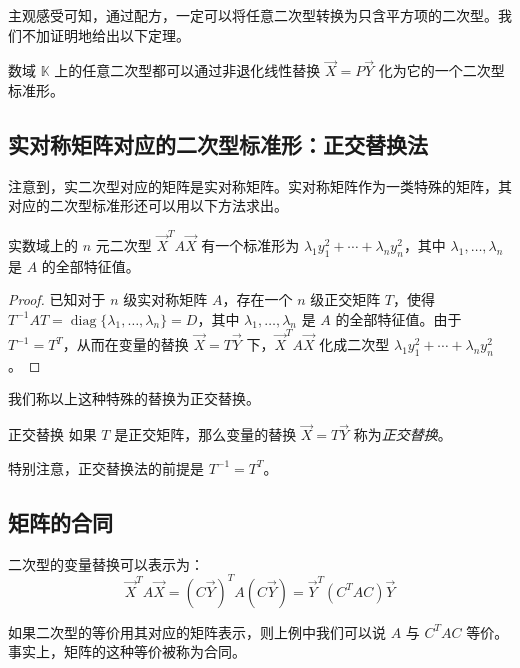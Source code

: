 主观感受可知，通过配方，一定可以将任意二次型转换为只含平方项的二次型。我们不加证明地给出以下定理。


\begin{theorem}
	数域 $\mathbb K$ 上的任意二次型都可以通过非退化线性替换 $\vec X = P \vec Y$ 化为它的一个二次型标准形。
\end{theorem}

\subsection{实对称矩阵对应的二次型标准形：正交替换法}

注意到，实二次型对应的矩阵是实对称矩阵。实对称矩阵作为一类特殊的矩阵，其对应的二次型标准形还可以用以下方法求出。

\begin{theorem}
	实数域上的 $n$ 元二次型 $\vec X^T A \vec X$ 有一个标准形为 $\lambda_1 y_1^2 + \cdots + \lambda_n y_n^2$，其中 $\lambda_1, \ldots, \lambda_n$ 是 $A$ 的全部特征值。
\end{theorem}

\begin{proof}
	已知对于 $n$ 级实对称矩阵 $A$，存在一个 $n$ 级正交矩阵 $T$，使得 $T^{-1} AT = \operatorname{diag}\{\lambda_1, \ldots, \lambda_n\} = D$，其中 $\lambda_1, \ldots, \lambda_n$ 是 $A$ 的全部特征值。由于 $T^{-1} = T^T$，从而在变量的替换 $\vec X = T \vec Y$ 下，$\vec X^T A \vec X$ 化成二次型 $\lambda_1 y_1^2 + \cdots + \lambda_n y_n^2$。
\end{proof}

我们称以上这种特殊的替换为正交替换。

\begin{definition}{正交替换}
	如果 $T$ 是正交矩阵，那么变量的替换 $\vec X = T \vec Y$ 称为\emph{正交替换}。
\end{definition}

特别注意，正交替换法的前提是 $T^{-1} = T^T$。

\subsection{矩阵的合同}

二次型的变量替换可以表示为：
$$
\vec X^T A \vec X = (C \vec Y)^T A (C \vec Y) = \vec Y^T (C^T A C) \vec Y
$$

如果二次型的等价用其对应的矩阵表示，则上例中我们可以说 $A$ 与 $C^T A C$ 等价。事实上，矩阵的这种等价被称为合同。

